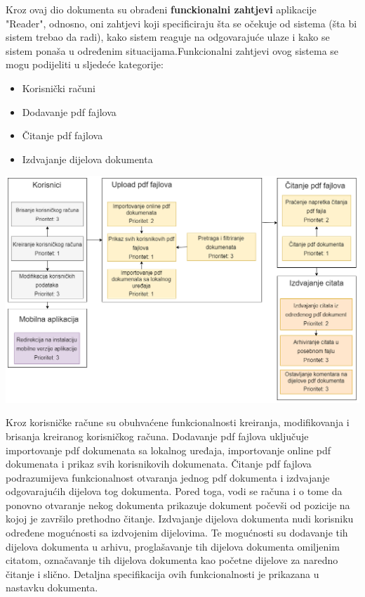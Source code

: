 Kroz ovaj dio dokumenta su obrađeni \textbf{funckionalni zahtjevi} aplikacije "Reader", odnosno, oni zahtjevi koji specificiraju šta se očekuje od sistema (šta bi sistem trebao da radi), kako sistem reaguje na odgovarajuće ulaze i kako se sistem ponaša u određenim situacijama.\newline Funkcionalni zahtjevi ovog sistema se mogu podijeliti u sljedeće kategorije:
\begin{itemize}
    \item Korisnički računi
    \item Dodavanje pdf fajlova
    \item Čitanje pdf fajlova
    \item Izdvajanje dijelova dokumenta
\end{itemize}

\begin{center}
    \includegraphics[scale=0.5]{images/dijagram.png}   
\end{center}

Kroz korisničke račune su obuhvaćene funkcionalnosti kreiranja, modifikovanja i brisanja kreiranog korisničkog računa. Dodavanje pdf fajlova uključuje importovanje pdf dokumenata sa lokalnog uređaja, importovanje online pdf dokumenata i prikaz svih korisnikovih dokumenata. Čitanje pdf fajlova podrazumijeva funkcionalnost otvaranja jednog pdf dokumenta i izdvajanje odgovarajućih dijelova tog dokumenta. Pored toga, vodi se računa i o tome da ponovno otvaranje nekog dokumenta prikazuje dokument počevši od pozicije na kojoj je završilo prethodno čitanje. Izdvajanje dijelova dokumenta nudi korisniku određene mogućnosti sa izdvojenim dijelovima. Te mogućnosti su dodavanje tih dijelova dokumenta u arhivu, proglašavanje tih dijelova dokumenta omiljenim citatom, označavanje tih dijelova dokumenta kao početne dijelove za naredno čitanje i slično. Detaljna specifikacija ovih funkcionalnosti je prikazana u nastavku dokumenta.


